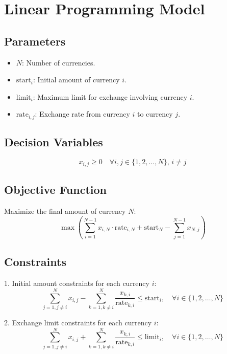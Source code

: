 \documentclass{article}
\begin{document}
\section*{Linear Programming Model}

\subsection*{Parameters}
\begin{itemize}
    \item \( N \): Number of currencies.
    \item \( \text{start}_i \): Initial amount of currency \( i \).
    \item \( \text{limit}_i \): Maximum limit for exchange involving currency \( i \).
    \item \( \text{rate}_{i,j} \): Exchange rate from currency \( i \) to currency \( j \).
\end{itemize}

\subsection*{Decision Variables}
\[
x_{i,j} \geq 0 \quad \forall i, j \in \{1, 2, \ldots, N\}, \, i \neq j
\]

\subsection*{Objective Function}
Maximize the final amount of currency \( N \):
\[
\max \left( \sum_{i=1}^{N-1} x_{i,N} \cdot \text{rate}_{i,N} + \text{start}_N - \sum_{j=1}^{N-1} x_{N,j} \right)
\]

\subsection*{Constraints}
1. Initial amount constraints for each currency \( i \):
\[
\sum_{j=1, j \neq i}^{N} x_{i,j} - \sum_{k=1, k \neq i}^{N} \frac{x_{k,i}}{\text{rate}_{k,i}} \leq \text{start}_i, \quad \forall i \in \{1, 2, \ldots, N\}
\]

2. Exchange limit constraints for each currency \( i \):
\[
\sum_{j=1, j \neq i}^{N} x_{i,j} + \sum_{k=1, k \neq i}^{N} \frac{x_{k,i}}{\text{rate}_{k,i}} \leq \text{limit}_i, \quad \forall i \in \{1, 2, \ldots, N\}
\]
\end{document}
